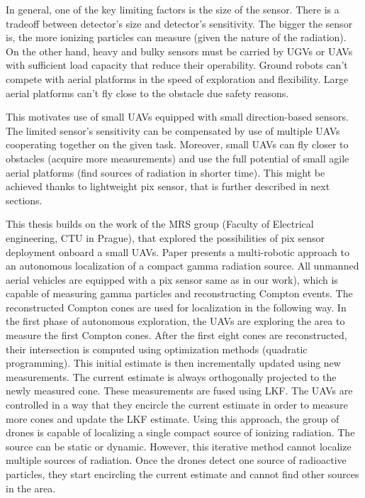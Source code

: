 In general, one of the key limiting factors is the size of the sensor.
There is a tradeoff between detector's size and detector's sensitivity.
The bigger the sensor is, the more ionizing particles can measure (given the nature of the radiation).
On the other hand, heavy and bulky sensors must be carried by \ac{UGV}s or \ac{UAV}s with sufficient load capacity that reduce their operability. 
Ground robots can't compete with aerial platforms in the speed of exploration and flexibility.
Large aerial platforms can't fly close to the obstacle due safety reasons.

This motivates use of small \ac{UAV}s equipped with small direction-based sensors.
The limited sensor's sensitivity can be compensated by use of multiple \ac{UAV}s cooperating together on the given task.
Moreover, small \ac{UAV}s can fly closer to obstacles (acquire more measurements) and use the full potential of small agile aerial platforms (find sources of radiation in shorter time).
This might be achieved thanks to lightweight \ac{pix} \cite{baca2019timepix} sensor, that is further described in next sections.

This thesis builds on the work of the MRS group (Faculty of Electrical engineering, CTU in Prague), that explored the possibilities of \ac{pix} sensor deployment onboard a small \ac{UAV}s. 
Paper \cite{baca2021gamma} presents a multi-robotic approach to an autonomous localization of a compact gamma radiation source. 
All unmanned aerial vehicles are equipped with a \ac{pix} sensor same as in our work), which is capable of measuring gamma particles and reconstructing Compton events. 
The reconstructed Compton cones are used for localization in the following way.
In the first phase of autonomous exploration, the \ac{UAV}s are exploring the area to measure the first Compton cones. 
After the first eight cones are reconstructed, their intersection is computed using optimization methods (quadratic programming). 
This initial estimate is then incrementally updated using new measurements. 
The current estimate is always orthogonally projected to the newly measured cone. 
These measurements are fused using \ac{LKF}. 
The \ac{UAV}s are controlled in a way that they encircle the current estimate in order to measure more cones and update the \ac{LKF} estimate.
Using this approach, the group of drones is capable of localizing a single compact source of ionizing radiation. 
The source can be static or dynamic. 
However, this iterative method cannot localize multiple sources of radiation.
Once the drones detect one source of radioactive particles, they start encircling the current estimate and cannot find other sources in the area.

